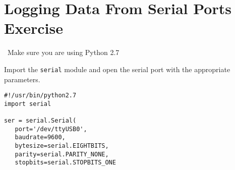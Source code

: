 \documentclass[a4paper,11pt]{article}
\begin{document}
\section{Logging Data From Serial Ports Exercise}

{\center~Make sure you are using Python 2.7}

\begin{question}
Import the \texttt{serial} module and 
open the serial port with the appropriate parameters.
\end{question}
\newsavebox\serbasic
\begin{lrbox}{\serbasic}
\begin{minipage}{\textwidth}
\begin{verbatim}
#!/usr/bin/python2.7
import serial

ser = serial.Serial(
   port='/dev/ttyUSB0',
   baudrate=9600,
   bytesize=serial.EIGHTBITS,
   parity=serial.PARITY_NONE,
   stopbits=serial.STOPBITS_ONE

\end{verbatim}
\end{minipage}
\end{lrbox}
\end{document}
